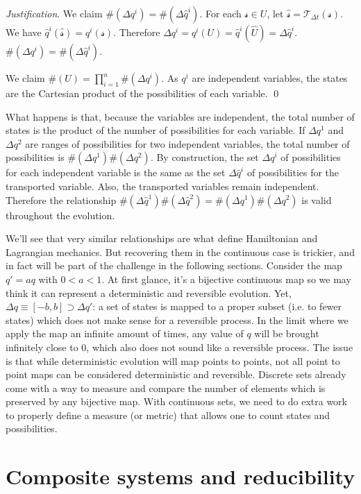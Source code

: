 \documentclass[aps,pra,10pt,twocolumn,floatfix,nofootinbib]{revtex4-1}
\numberwithin{equation}{section}
\theoremstyle{definition}
\newenvironment{justification}{\emph{Justification}.}{\qed}
\begin{document}
\begin{justification}
	We claim $\#(\Delta q^i)=\#(\Delta \hat{q}^i)$. For each $\mathcal{s} \in U$, let $\hat{\mathcal{s}}=\mathcal{T}_{\Delta t}(\mathcal{s})$. We have $\hat{q}^i(\hat{\mathcal{s}}) = q^i(\mathcal{s})$. Therefore $\Delta q^i = q^i(U) = \hat{q}^i(\hat{U})=\Delta \hat{q}^i$. $\#(\Delta q^i)=\#(\Delta \hat{q}^i)$.
	
	We claim $\#(U)=\prod\limits_{i=1}^{n}\#(\Delta q^i)$. As $q^i$ are independent variables, the states are the Cartesian product of the possibilities of each variable.
\end{justification}

What happens is that, because the variables are independent, the total number of states is the product of the number of possibilities for each variable. If $\Delta q^1$ and $\Delta q^2$ are ranges of possibilities for two independent variables, the total number of possibilities is $\#(\Delta q^1) \#(\Delta q^2)$. By construction, the set $\Delta q^i$ of possibilities for each independent variable is the same as the set $\Delta \hat{q}^i$ of possibilities for the transported variable. Also, the transported variables remain independent. Therefore the relationship $\#(\Delta \hat{q}^1) \#(\Delta \hat{q}^2) = \#(\Delta q^1) \#(\Delta q^2)$ is valid throughout the evolution.

We'll see that very similar relationships are what define Hamiltonian and Lagrangian mechanics. But recovering them in the continuous case is trickier, and in fact will be part of the challenge in the following sections. Consider the map $q'=aq$ with $0<a<1$. At first glance, it's a bijective continuous map so we may think it can represent a deterministic and reversible evolution. Yet, $\Delta q \equiv [-b, b] \supset \Delta q'$: a set of states is mapped to a proper subset (i.e. to fewer states) which does not make sense for a reversible process. In the limit where we apply the map an infinite amount of times, any value of $q$ will be brought infinitely close to $0$, which also does not sound like a reversible process. The issue is that while deterministic evolution will map points to points, not all point to point maps can be considered deterministic and reversible. Discrete sets already come with a way to measure and compare the number of elements which is preserved by any bijective map. With continuous sets, we need to do extra work to properly define a measure (or metric) that allows one to count states and possibilities.

\section{Composite systems and reducibility}
\label{sec:reducibility}
\end{document}
